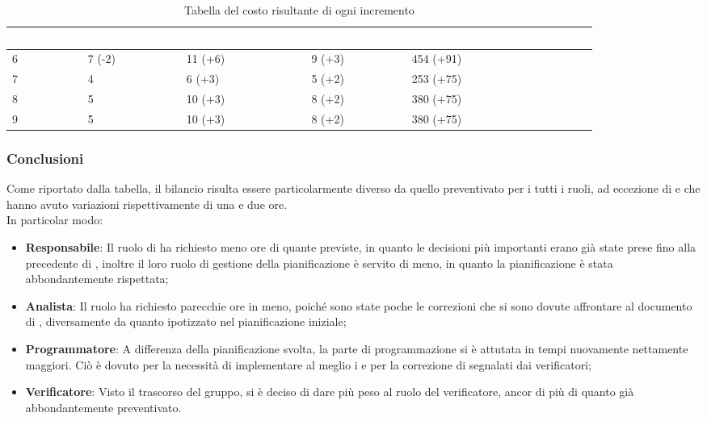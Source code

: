 {
\renewcommand{\arraystretch}{1.65}
\centering
\begin{longtable}{ C{2.1cm} C{2.7cm} C{3cm} C{3cm} C{3.3cm} }
\caption{Tabella del costo risultante di ogni incremento}\\
\textcolor{white}{\textbf{Incremento}} & 
\textcolor{white}{\textbf{Ore progettista}} &
\textcolor{white}{\textbf{Ore programmatore}}&
\textcolor{white}{\textbf{Ore verificatore}}&
\textcolor{white}{\textbf{Costo totale incremento (in \euro{})}}\\
\endhead

6 & 7 (-2) & 11 (+6) & 9 (+3) & 454 (+91) \\
7 & 4      &  6 (+3) & 5 (+2) & 253 (+75) \\
8 & 5      & 10 (+3) & 8 (+2) & 380 (+75) \\
9 & 5      & 10 (+3) & 8 (+2) & 380 (+75) \\

\end{longtable}
}

\subsubsection{Conclusioni}
Come riportato dalla tabella, il bilancio risulta essere particolarmente diverso da quello preventivato per i tutti i ruoli, ad eccezione di  e  che hanno avuto variazioni rispettivamente di una e due ore. \\
In particolar modo:
\begin{itemize}
	\item \textbf{Responsabile}: Il ruolo di \Responsabile{} ha richiesto meno ore di quante previste, in quanto le decisioni più importanti erano già state prese fino alla precedente  di , inoltre il loro ruolo di gestione della pianificazione è servito di meno, in quanto la pianificazione è stata abbondantemente rispettata;
	\item \textbf{Analista}: Il ruolo ha richiesto parecchie ore in meno, poiché sono state poche le correzioni che si sono dovute affrontare al documento di \AdR{}, diversamente da quanto ipotizzato nel pianificazione iniziale;
	\item \textbf{Programmatore}: A differenza della pianificazione svolta, la parte di programmazione si è attutata in tempi nuovamente nettamente maggiori. Ciò è dovuto per la necessità di implementare al meglio i  e per la correzione di  segnalati dai verificatori;
	\item \textbf{Verificatore}: Visto il trascorso del gruppo, si è deciso di dare più peso al ruolo del verificatore, ancor di più di quanto già abbondantemente preventivato.
\end{itemize}
